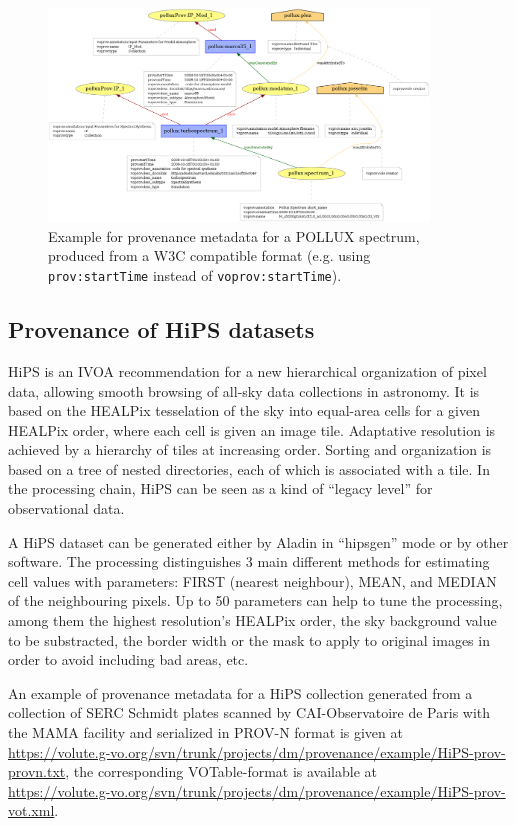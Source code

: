 \begin{figure}
\centering
\includegraphics[width=0.9\textwidth]{usecase_Pollux_example1.png}
\caption[Example for provenance metadata for a POLLUX spectrum]{Example for provenance metadata for a POLLUX spectrum, produced from a W3C compatible format (e.g. using \texttt{prov:startTime} instead of \texttt{voprov:startTime}).}
\label{fig:pollux}
\end{figure}

\subsection{Provenance of HiPS datasets}
HiPS \citep{std:HiPs} is an IVOA recommendation for a new hierarchical
organization of pixel data, allowing smooth browsing of all-sky data collections
in astronomy. It is based on the HEALPix tesselation of the sky into equal-area
cells for a given HEALPix order, where each cell is given an image tile.
Adaptative resolution is achieved by a hierarchy of tiles at increasing
order. Sorting and organization is based on a tree of nested directories, each
of which is associated with a tile. In the processing chain, HiPS can be seen
as a kind of ``legacy level'' for observational data.


A HiPS dataset can be generated either by Aladin in ``hipsgen'' mode or by other
software.
The processing distinguishes 3 main different methods for estimating cell values
with parameters: FIRST (nearest neighbour), MEAN, and MEDIAN of the neighbouring
pixels. Up to 50 parameters can help to tune the processing, among them the
highest resolution's HEALPix order, the sky background value to be substracted,
the border width or the mask to apply to original images in order to avoid
including bad areas, etc.


An example of provenance metadata for a HiPS collection generated from a
collection of SERC Schmidt plates scanned by CAI-Observatoire de Paris with the
MAMA facility and serialized in PROV-N format is given at \\
\url{https://volute.g-vo.org/svn/trunk/projects/dm/provenance/example/HiPS-prov-provn.txt}, the corresponding VOTable-format is available at \\
\url{https://volute.g-vo.org/svn/trunk/projects/dm/provenance/example/HiPS-prov-vot.xml}.

